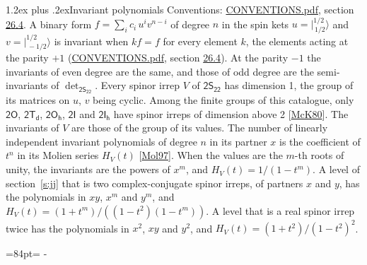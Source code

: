 \documentclass[10pt,a4paper]{article}
\makeatletter
\renewcommand\section{\@startsection{section}{1}{\z@}{-3ex plus -1ex minus -.2ex}%
  {1.2ex plus .2ex}{\normalfont\large\sffamily\bfseries\color{parttitle}}}
\newcommand{\needspace}[1]{\par\penalty-100\begingroup\dimen0=#1\relax\dimen2=\pagegoal
  \advance\dimen2-\pagetotal\ifdim\dimen0>\dimen2\relax\ifdim\dimen2>0pt\vfil\break\fi\fi
  \endgroup}
\numberwithin{equation}{section}
\newcommand{\grp}[1]{\mathsf{#1}}
\newcommand{\jm}[2]{\bigl\lvert{}^{#1}_{\,#2}\bigr\rangle}
\makeatother
\begin{document}
\section{Invariant polynomials}\label{s:invariants}
Conventions: \href{../../CONVENTIONS.pdf}{CONVENTIONS.pdf}, section \href{../../CONVENTIONS.pdf\#conv.26.4}{26.4}.
\leavevmode\label{n:local.binary.form}A binary form $f = \sum_i c_i\, u^i v^{n-i}$ of degree $n$ in the spin kets $u = \jm{1/2}{1/2}$ and $v = \jm{1/2}{-1/2}$ is invariant when $k f = f$ for every element $k$, the elements acting at the parity $+1$ (\href{../../CONVENTIONS.pdf}{CONVENTIONS.pdf}, section \href{../../CONVENTIONS.pdf\#conv.26.4}{26.4}). At the parity $-1$ the invariants of even degree are the same, and those of odd degree are the semi-invariants of $\det_{\grp{2S_{22}}}$.
\leavevmode\label{n:function.hilbert}Every spinor irrep $V$ of $\grp{2S_{22}}$ has dimension 1, the group of its matrices on $u$, $v$ being cyclic. Among the finite groups of this catalogue, only $\grp{2O}$, $\grp{2T_{d}}$, $\grp{2O_{h}}$, $\grp{2I}$ and $\grp{2I_{h}}$ have spinor irreps of dimension above 2 [\href{../../../REFERENCES.pdf\#ref.McK80}{McK80}]. The invariants of $V$ are those of the group of its values. \label{n:local.partner.x}The number of linearly independent invariant polynomials of degree $n$ in its partner $x$ is the coefficient of $t^n$ in its Molien series $H_V(t)$ [\href{../../../REFERENCES.pdf\#ref.Mol97}{Mol97}]. When the values are the $m$-th roots of unity, the invariants are the powers of $x^{m}$, and $H_V(t) = 1/(1 - t^{m})$. A level of section~\ref{s:jj} that is two complex-conjugate spinor irreps, of partners $x$ and $y$, has the polynomials in $xy$, $x^{m}$ and $y^{m}$, and $H_V(t) = (1 + t^{m})/((1 - t^{2})(1 - t^{m}))$. A level that is a real spinor irrep twice has the polynomials in $x^{2}$, $xy$ and $y^{2}$, and $H_V(t) = (1 + t^{2})/(1 - t^{2})^{2}$.
\needspace{84pt}
\end{document}
